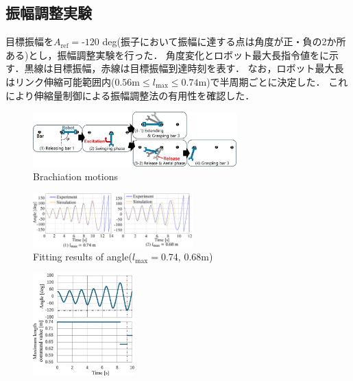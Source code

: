 \begin{small}
\subsection{振幅調整実験}
目標振幅を$A_{\mathrm{ref}}=‐120$ deg(振子において振幅に達する点は角度が正・負の2か所ある)とし，振幅調整実験を行った．
角度変化とロボット最大長指令値をに示す．黒線は目標振幅，赤線は目標振幅到達時刻を表す．
なお，ロボット最大長はリンク伸縮可能範囲内($0.56\mathrm{m}\le l_{\mathrm{max}} \le 0.74\mathrm{m}$)で半周期ごとに決定した．
これにより伸縮量制御による振幅調整法の有用性を確認した．
\begin{figure}[t]
  \centering
  \includegraphics[width=0.7\textwidth]{fig/brachiationFig-5.eps} %
  \vspace{-5mm}
  \caption{Brachiation motions}
\end{figure}
\begin{figure}[t]
  \centering
  \includegraphics[width=0.55\textwidth]{fig/FittingAngle3.eps} %
  \vspace{-10mm}
  \caption{Fitting results of angle($l_{\mathrm{max}}=$0.74, 0.68m)}
\end{figure}
\begin{figure}[h]
  \centering
  \includegraphics[width=0.35\textwidth]{fig/AdjustForMaezuri.eps} %
  \vspace{-4mm}

\end{figure}
\end{small}
